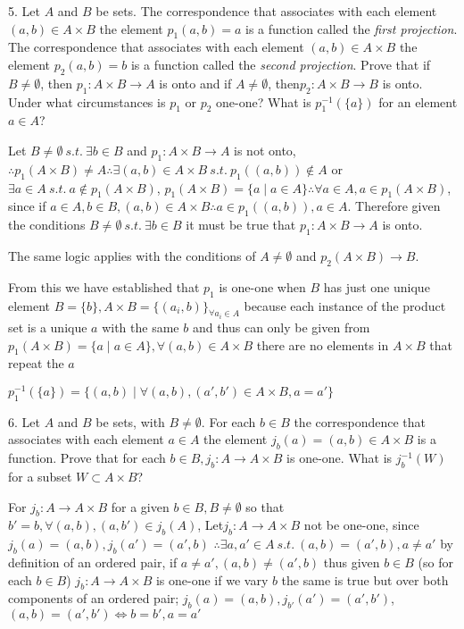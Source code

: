 5. Let $A$ and $B$ be sets. The correspondence that associates with each element $(a, b) \in A \times B$ the element $p_{1}(a, b) = a$ is a function called the \textit{first projection}. The correspondence that associates with each element $(a, b) \in A \times B$ the element $p_{2}(a, b) = b$ is a function called the \textit{second projection}. Prove that if $B \not = \emptyset$, then $p_{1}:A \times B \rightarrow A$ is onto and if $A \not = \emptyset$, then$p_{2}:A \times B  \rightarrow B$ is onto. Under what circumstances is $p_{1}$ or $p_{2}$ one-one? What is $p_{1}^{-1}(\{a\})$ for an element $a \in A$?

Let $B \not = \emptyset \ s.t.\ \exists b \in B $ and $p_{1}:A \times B \rightarrow A$ is not onto,
$\therefore p_{1}(A\times B) \not = A \therefore \exists (a, b) \in A \times B\ s.t.\ p_{1}((a, b)) \not \in A$ or $\exists a \in A\ s.t.\ a\not \in p_{1}(A\times B)$,
$p_{1}(A \times B) = \{ a \mid  a \in A\} \therefore \forall a \in A, a \in p_{1}(A \times B)$,
since if $a \in A, b \in B, (a, b) \in A \times B \therefore a \in p_{1}((a, b)), a \in A$.
Therefore given the conditions $B \not = \emptyset \ s.t.\ \exists b \in B $ it must be true that $p_{1}:A \times B \rightarrow A$ is onto.

The same logic applies with the conditions of $A \not = \emptyset$ and $p_{2}(A \times B) \rightarrow B$.

From this we have established that $p_{1}$ is one-one when $B$ has just one unique element $B = \{ b\}, A \times B = \{ (a_{i}, b)\}_{\forall a_{i} \in A}$ because each instance of the product set is a unique $a$ with the same $b$ and thus can only be given from $p_{1}(A \times B) = \{ a \mid  a \in A\}, \forall (a, b) \in A \times B$ there are no elements in $A \times B$ that repeat the $a$

$p_{1}^{-1}(\{ a\}) = \{(a, b) \mid \forall (a, b), (a', b') \in A \times B, a = a' \}$

6. Let $A$ and $B$ be sets, with $B \not = \emptyset$. For each $b \in B$ the correspondence that associates with each element $a \in A$ the element $j_{b}(a) = (a, b) \in A \times B$ is a function. Prove that for each $b \in B, j_{b}:A \rightarrow A \times B$ is one-one. What is $j_{b}^{-1}(W)$ for a subset $W \subset A \times B$?

For $j_{b}:A \rightarrow A \times B$ for a given $b \in B, B \not = \emptyset$ so that $b' = b, \forall(a, b), (a, b') \in j_{b}(A)$,
Let$j_{b}:A \rightarrow A \times B$ not be one-one, since $j_{b}(a) = (a, b), j_{b}(a') = (a', b)$ $\therefore \exists a , a' \in A\ s.t.\ (a, b) = (a', b), a \not = a'$ 
by definition of an ordered pair, if $a \not = a', (a, b) \not = (a', b)$
thus given $b \in B$ (so for each $b \in B$) $j_{b}:A \rightarrow A \times B$ is one-one
if we vary $b$ the same is true but over both components of an ordered pair; $j_{b}(a) = (a, b), j_{b'}(a') = (a', b')$, $(a, b) = (a', b') \iff b = b', a = a'$

